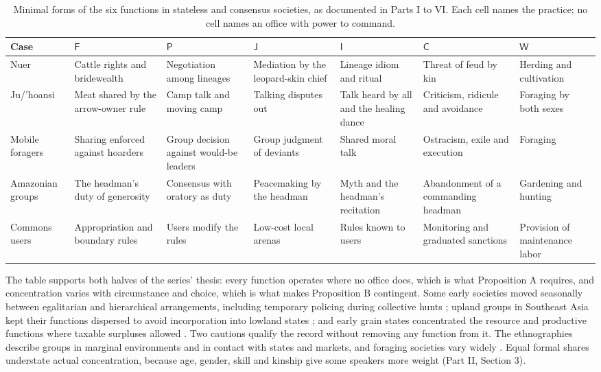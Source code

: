 \documentclass[11pt,letterpaper]{article}
\theoremstyle{definition}
\theoremstyle{remark}
\newcommand{\pF}{\mathsf{F}}
\newcommand{\pP}{\mathsf{P}}
\newcommand{\pJ}{\mathsf{J}}
\newcommand{\pI}{\mathsf{I}}
\newcommand{\pC}{\mathsf{C}}
\newcommand{\pW}{\mathsf{W}}
\begin{document}
\begin{table}[!htbp]
\centering
\small
\caption{Minimal forms of the six functions in stateless and consensus societies, as documented in Parts I to VI. Each cell names the practice; no cell names an office with power to command.}
\label{tab:hardcases}
\footnotesize
\setlength{\tabcolsep}{3pt}
\begin{tabularx}{\textwidth}{@{}L{1.6cm}YYYYYY@{}}
\toprule
Case & $\pF$ & $\pP$ & $\pJ$ & $\pI$ & $\pC$ & $\pW$ \\
\midrule
Nuer & Cattle rights and bridewealth & Negotiation among lineages & Mediation by the leopard-skin chief & Lineage idiom and ritual & Threat of feud by kin & Herding and cultivation \\
Ju/'hoansi & Meat shared by the arrow-owner rule & Camp talk and moving camp & Talking disputes out & Talk heard by all and the healing dance & Criticism, ridicule and avoidance & Foraging by both sexes \\
Mobile foragers & Sharing enforced against hoarders & Group decision against would-be leaders & Group judgment of deviants & Shared moral talk & Ostracism, exile and execution & Foraging \\
Amazonian groups & The headman's duty of generosity & Consensus with oratory as duty & Peacemaking by the headman & Myth and the headman's recitation & Abandonment of a commanding headman & Gardening and hunting \\
Commons users & Appropriation and boundary rules & Users modify the rules & Low-cost local arenas & Rules known to users & Monitoring and graduated sanctions & Provision of maintenance labor \\
\bottomrule
\end{tabularx}
\end{table}

The table supports both halves of the series' thesis: every function operates where no office does, which is what Proposition A requires, and concentration varies with circumstance and choice, which is what makes Proposition B contingent. Some early societies moved seasonally between egalitarian and hierarchical arrangements, including temporary policing during collective hunts \citep{graeber2021}; upland groups in Southeast Asia kept their functions dispersed to avoid incorporation into lowland states \citep{scott2009}; and early grain states concentrated the resource and productive functions where taxable surpluses allowed \citep{scott2017}. Two cautions qualify the record without removing any function from it. The ethnographies describe groups in marginal environments and in contact with states and markets, and foraging societies vary widely \citep{kelly1995}. Equal formal shares understate actual concentration, because age, gender, skill and kinship give some speakers more weight (Part II, Section 3).
\end{document}
